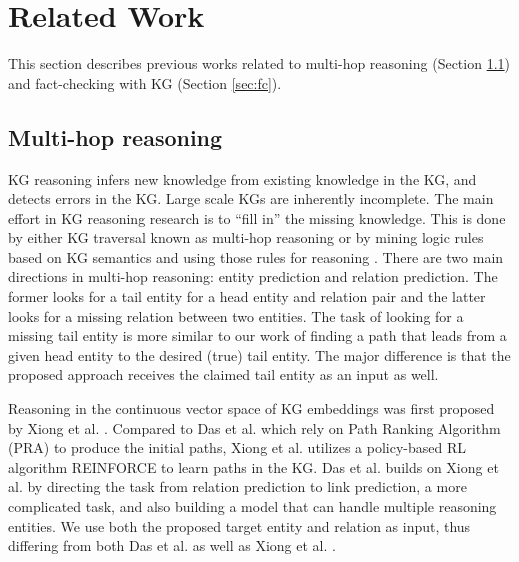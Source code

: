 \section{Related Work}\label{related}
This section describes previous works related to multi-hop reasoning (Section \ref{sec:mh}) and fact-checking with KG (Section \ref{sec:fc}). %


\subsection{Multi-hop reasoning}\label{sec:mh}
KG reasoning infers new knowledge from existing knowledge in the KG, and detects errors in the KG. Large scale KGs are inherently incomplete. The main effort in KG reasoning research is to ``fill in'' the missing knowledge. This is done by either KG traversal known as multi-hop reasoning \cite{Das2017,  Lv2020, Wan2021} 
or by mining logic rules based on KG semantics and using those rules for reasoning \cite{Zhang2019, Qu2021, Minervini2021}.  %
There are two main directions in multi-hop reasoning: entity prediction and relation prediction. The former looks for a tail entity for a head entity and relation pair
and the latter looks for a missing relation between two entities.
The task of looking for a missing tail entity is more similar to our work of finding a path that leads from a given head entity to the desired (true) tail entity. The major difference is that the proposed approach receives the claimed tail entity as an input as well.

Reasoning in the continuous vector space of KG embeddings was first proposed by Xiong et al. \cite{Xiong2017}. Compared to Das et al. \cite{Das2017a} %
which rely on Path Ranking Algorithm (PRA) to produce the initial paths, Xiong et al. \cite{Xiong2017} utilizes a policy-based RL algorithm REINFORCE to learn paths in the KG. Das et al. \cite{Das2017} builds on Xiong et al. \cite{Xiong2017} by directing the task from relation prediction to link prediction, a more complicated task, and also building a model that can handle multiple reasoning entities. %
We use both the proposed target entity and relation as input, thus differing from both Das et al. 
\cite{Das2017} as well as Xiong et al. \cite{Xiong2017}.

